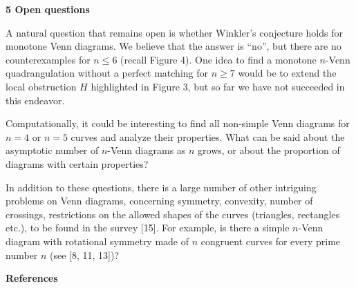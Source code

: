 \documentclass[10pt,a4paper]{article}
\begin{document}
\par\medskip\noindent\textbf{5 Open questions}\par
A natural question that remains open is whether Winkler’s conjecture holds for monotone Venn diagrams. We believe that the answer is “no”, but there are no counterexamples for $n\leq 6$ (recall Figure 4). One idea to find a monotone $n$-Venn quadrangulation without a perfect matching for $n\geq 7$ would be to extend the local obstruction $H$ highlighted in Figure 3, but so far we have not succeeded in this endeavor.
\par
\par
Computationally, it could be interesting to find all non-simple Venn diagrams for $n=4$ or $n=5$ curves and analyze their properties. What can be said about the asymptotic number of $n$-Venn diagrams as $n$ grows, or about the proportion of diagrams with certain properties?
\par
\par
In addition to these questions, there is a large number of other intriguing problems on Venn diagrams, concerning symmetry, convexity, number of crossings, restrictions on the allowed shapes of the curves (triangles, rectangles etc.), to be found in the survey [15]. For example, is there a simple $n$-Venn diagram with rotational symmetry made of $n$ congruent curves for every prime number $n$ (see [8, 11, 13])?
\par
\par
\par\medskip\noindent\textbf{References}\par
\end{document}
